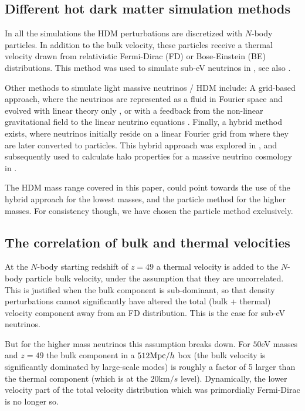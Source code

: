 \documentclass[11pt,a4paper]{article}
\renewcommand\({\left(}
\renewcommand\){\right)}
\renewcommand\[{\left[}
\renewcommand\]{\right]}
\begin{document}
\subsection{Different hot dark matter simulation methods}
In all the simulations the HDM perturbations are discretized with $N$-body particles. In addition to the bulk velocity, these particles receive a thermal velocity drawn from relativistic Fermi-Dirac (FD) or Bose-Einstein (BE) distributions. This method was used to simulate sub-eV neutrinos in \cite{Brandbyge:2008rv}, see also \cite{Viel:2010bn, Agarwal:2010mt,Bird:2011rb}.

Other methods to simulate light massive neutrinos / HDM include: A grid-based approach, where the neutrinos are represented as a fluid in Fourier space and evolved with linear theory only \cite{Brandbyge:2008js}, or with a feedback from the non-linear gravitational field to the linear neutrino equations \cite{AliHaimoud:2012vj}. Finally, a hybrid method exists, where neutrinos initially reside on a linear Fourier grid from where they are later converted to particles. This hybrid approach was explored in \cite{Brandbyge:2009ce}, and subsequently used to calculate halo properties for a massive neutrino cosmology in \cite{Brandbyge:2010ge}.

The HDM mass range covered in this paper, could point towards the use of the hybrid approach for the lowest masses, and the particle method for the higher masses. For consistency though, we have chosen the particle method exclusively.


\subsection{The correlation of bulk and thermal velocities}
At the $N$-body starting redshift of $z=49$ a thermal velocity is added to the $N$-body particle bulk velocity, under the assumption that they are uncorrelated. This is justified when the bulk component is sub-dominant, so that density perturbations cannot significantly have altered the total (bulk + thermal) velocity component away from an FD distribution. This is the case for sub-eV neutrinos.

But for the higher mass neutrinos this assumption breaks down. For $50$eV masses and $z=49$ the bulk component in a $512 {\rm Mpc} / h$ box (the bulk velocity is significantly dominated by large-scale modes) is roughly a factor of 5 larger than the thermal component (which is at the $20$km$/s$ level). Dynamically, the lower velocity part of the total velocity distribution which was primordially Fermi-Dirac is no longer so.
\end{document}
